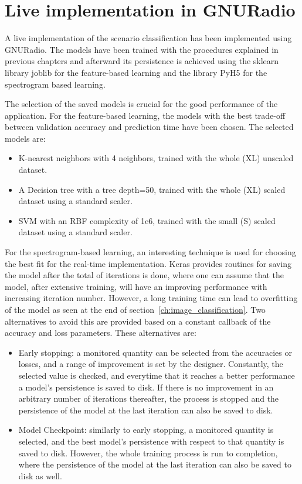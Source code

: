 \acresetall
\chapter{Live implementation in GNURadio}\label{chapter:live} \label{ch:live}

A live implementation of the scenario classification has been implemented using GNURadio. The models have been trained with the procedures explained in previous chapters and afterward its persistence is achieved using the sklearn library joblib for the feature-based learning and the library PyH5 for the spectrogram based learning.

The selection of the saved models is crucial for the good performance of the application. For the feature-based learning, the models with the best trade-off between validation accuracy and prediction time have been chosen. The selected models are:

\begin{itemize}
    \item K-nearest neighbors with 4 neighbors, trained with the whole (XL) unscaled dataset.
    \item A Decision tree with a tree depth=50, trained with the whole (XL) scaled dataset using a standard scaler.
    \item \ac{SVM} with an RBF complexity of 1e6, trained with the small (S) scaled dataset using a standard scaler.
\end{itemize}

For the spectrogram-based learning, an interesting technique is used for choosing the best fit for the real-time implementation. Keras provides routines for saving the model after the total of iterations is done, where one can assume that the model, after extensive training, will have an improving performance with increasing iteration number. However, a long training time can lead to overfitting of the model as seen at the end of section~\ref{ch:image_classification}. Two alternatives to avoid this are provided based on a constant callback of the accuracy and loss parameters. These alternatives are:

\begin{itemize}
    \item Early stopping: a monitored quantity can be selected from the accuracies or losses, and a range of improvement is set by the designer. Constantly, the selected value is checked, and everytime that it reaches a better performance a model's persistence is saved to disk. If there is no improvement in an arbitrary number of iterations thereafter, the process is stopped and the persistence of the model at the last iteration can also be saved to disk.
    \item Model Checkpoint: similarly to early stopping, a monitored quantity is selected, and the best model's persistence with respect to that quantity is saved to disk. However, the whole training process is run to completion, where the persistence of the model at the last iteration can also be saved to disk as well.
\end{itemize}

